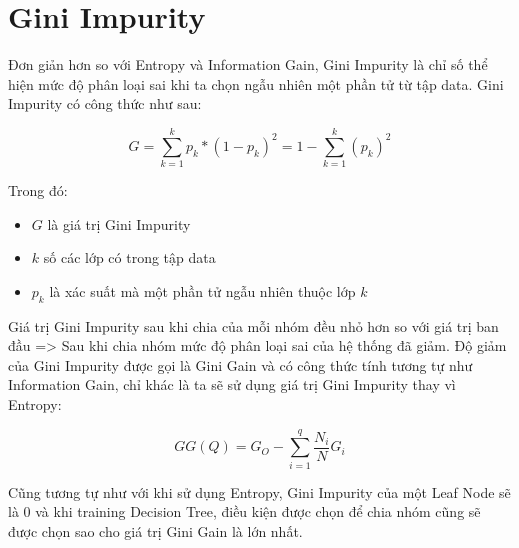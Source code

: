 \section{Gini Impurity}
Đơn giản hơn so với Entropy và Information Gain, Gini Impurity là chỉ số thể hiện mức độ phân loại sai khi ta chọn ngẫu nhiên một phần tử từ tập data. Gini Impurity có công thức như sau:

\begin{equation*}
    G = \sum_{k=1}^{k}p_k*(1-p_k)^2 = 1 - \sum_{k=1}^{k}(p_k)^2
\end{equation*}

Trong đó:
\begin{itemize}
    \item $G$ là giá trị Gini Impurity
    \item $k$ số các lớp có trong tập data
    \item $p_k$ là xác suất mà một phần tử ngẫu nhiên thuộc lớp $k$
\end{itemize}

Giá trị Gini Impurity sau khi chia của mỗi nhóm đều nhỏ hơn so với giá trị ban đầu => Sau khi chia nhóm mức độ phân loại sai của hệ thống đã giảm. Độ giảm của Gini Impurity được gọi là Gini Gain và có công thức tính tương tự như Information Gain, chỉ khác là ta sẽ sử dụng giá trị Gini Impurity thay vì Entropy:

\begin{equation*}
    GG(Q) = G_O - \sum_{i=1}^{q}\frac{N_i}{N}G_i
\end{equation*}

Cũng tương tự như với khi sử dụng Entropy, Gini Impurity của một Leaf Node sẽ là 0 và khi training Decision Tree, điều kiện được chọn để chia nhóm cũng sẽ được chọn sao cho giá trị Gini Gain là lớn nhất.

